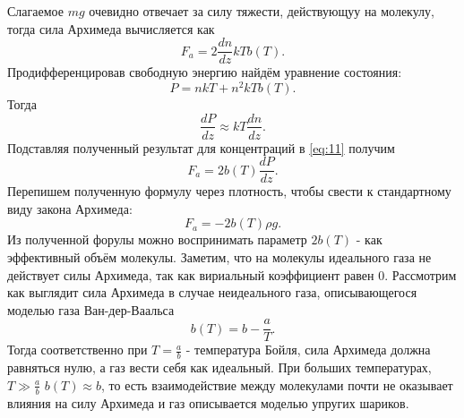 \documentclass[12pt]{article}
\begin{document}
Слагаемое $mg$ очевидно отвечает за силу тяжести, действующуу на молекулу, тогда сила Архимеда вычисляется как 
\begin{equation}
    F_a = 2 \frac{dn}{dz} kT b(T).
    \label{eq:11}
\end{equation}
Продифференцировав свободную энергию найдём уравнение состояния: 
\begin{equation}
    P = nkT + n^2kTb(T).
    \label{eq:12}
\end{equation}
Тогда 
\[
    \frac{dP}{dz} \approx kT \frac{dn}{dz}.
\]
Подставляя полученный результат для концентраций в \ref{eq:11} получим 
\begin{equation}
    F_a = 2b(T) \frac{dP}{dz}.
    \label{eq:13}
\end{equation}
Перепишем полученную формулу через плотность, чтобы свести к стандартному виду закона Архимеда: 
\begin{equation}
    F_a = -2b(T)\rho g.
    \label{eq:14}
\end{equation}
Из полученной форулы можно воспринимать параметр $2b(T)$ - как эффективный объём молекулы. 
Заметим, что на молекулы идеального газа не действует силы Архимеда, так как вириальный коэффициент равен 0. 
Рассмотрим как выглядит сила Архимеда в случае неидеального газа, описывающегося 
моделью газа Ван-дер-Ваальса 
\begin{equation}
    b(T) = b - \frac{a}{T}.
    \label{eq:15}
\end{equation}
Тогда соответственно при $T = \frac{a}{b}$ - температура Бойля, сила Архимеда должна равняться нулю, а газ вести себя как идеальный. 
При больших температурах, $T \gg \frac{a}{b}$ $b(T) \approx b$, то есть взаимодействие между молекулами 
почти не оказывает влияния на силу Архимеда и газ описывается моделью упругих шариков.   
\end{document}
